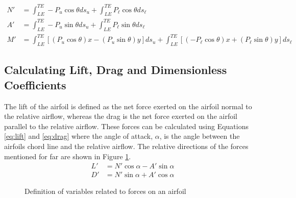 \documentclass[runningheads]{llncs}
\begin{document}
\begin{align}
    N' &= \int_{LE}^{TE} -P_u\cos\theta ds_u + \int_{LE}^{TE} P_\ell\cos\theta ds_\ell
    \label{eq:normal_force}\\
    A' &= \int_{LE}^{TE} -P_u\sin\theta ds_u + \int_{LE}^{TE} P_\ell\sin\theta ds_\ell
    \label{eq:axial_force}\\
    M' &= \int_{LE}^{TE} \left[(P_u\cos\theta)x - (P_u\sin\theta)y\right]ds_u + \int_{LE}^{TE} \left[(-P_\ell\cos\theta)x + (P_\ell\sin\theta)y\right]ds_\ell
    \label{eq:leading_edge_moment}
\end{align}

\subsection{Calculating Lift, Drag and Dimensionless Coefficients}

The lift of the airfoil is defined as the net force exerted on the airfoil normal to the relative airflow, whereas the drag is the net force exerted on the airfoil parallel to the relative airflow. These forces can be calculated using Equations \ref{eq:lift} and \ref{eq:drag} where the angle of attack, $\alpha$, is the angle between the airfoils chord line and the relative airflow. The relative directions of the forces mentioned for far are shown in Figure \ref{fig:airfoil_directions}.
\begin{align}
    L' &= N'\cos\alpha - A'\sin\alpha \label{eq:lift} \\
    D' &= N'\sin\alpha + A'\cos\alpha \label{eq:drag}
\end{align}

\begin{figure}
    \centering
    \caption{Definition of variables related to forces on an airfoil}
    \label{fig:airfoil_directions}
\end{figure}
\end{document}
